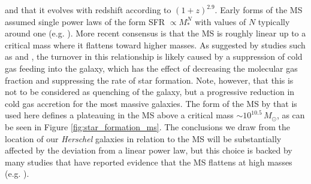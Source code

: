 \noindent and that it evolves with redshift according to $(1+z)^{2.9}$. Early forms of the MS assumed single power laws of the form SFR $\propto M_*^N$ with values of $N$ typically around one (e.g. \citealt{Daddi_2007, Elbaz_2007}). More recent consensus is that the MS is roughly linear up to a critical mass where it flattens toward higher masses. As suggested by studies such as \citealt{Daddi_2022} and \citealt{Popesso_2023}, the turnover in this relationship is likely caused by a suppression of cold gas feeding into the galaxy, which has the effect of decreasing the molecular gas fraction and suppressing the rate of star formation. Note, however, that this is not to be considered as quenching of the galaxy, but a progressive reduction in cold gas accretion for the most massive galaxies. The form of the MS by \citealt{Scoville_2017} that is used here defines a plateauing in the MS above a critical mass $\sim 10^{10.5}\,M_\odot$, as can be seen in Figure \ref{fig:star_formation_ms}. The conclusions we draw from the location of our \textit{Herschel} galaxies in relation to the MS will be substantially affected by the deviation from a linear power law, but this choice is backed by many studies that have reported evidence that the MS flattens at high masses (e.g. \citealt{Magnelli_2014, Whitaker_2014, Schreiber_2015, Tomczak_2016}).

